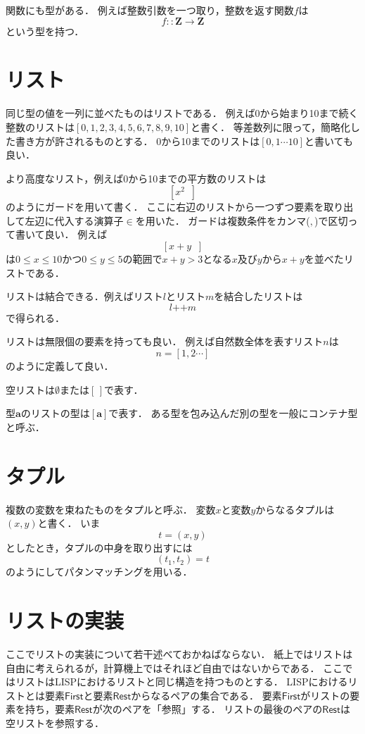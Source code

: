 \documentclass[twocolumn]{jsbook}
\newcommand{\guard}[1]{\mathop{\mid_{{#1}}}}
\newcommand{\listappend}{\mathop{++}}
\newcommand{\typename}[1]{\bm{#1}}
\newcommand{\integertype}{\typename{Z}}
\newcommand{\specialkeyword}[1]{\textsf{#1}}
\newcommand{\firstelem}{\specialkeyword{First}}
\newcommand{\restelems}{\specialkeyword{Rest}}
\begin{document}
関数にも型がある．
例えば整数引数を一つ取り，整数を返す関数$f$は$$f::\integertype\rightarrow\integertype$$という型を持つ．

\section{リスト}

同じ型の値を一列に並べたものはリストである．
例えば0から始まり10まで続く整数のリストは$[0,1,2,3,4,5,6,7,8,9,10]$と書く．
等差数列に限って，簡略化した書き方が許されるものとする．
0から10までのリストは$[0,1\dotsb10]$と書いても良い．

より高度なリスト，例えば0から10までの平方数のリストは$$\left[x^2\guard{x\in[0,1\dotsb 10]}\right]$$のようにガードを用いて書く．
ここに右辺のリストから一つずつ要素を取り出して左辺に代入する演算子$\in$を用いた．
ガードは複数条件をカンマ($,$)で区切って書いて良い．
例えば$$\left[x+y\guard{x\in[0,1\dotsb 10],\,y\in[0,1\dotsb 5],\,x+y>3}\right]$$は$0\le x\le 10$かつ$0\le y\le 5$の範囲で$x+y>3$となる$x$及び$y$から$x+y$を並べたリストである．

リストは結合できる．例えばリスト$l$とリスト$m$を結合したリストは$$l\listappend m$$で得られる．

リストは無限個の要素を持っても良い．
例えば自然数全体を表すリスト$n$は$$n=[1,2\dotsb]$$のように定義して良い．

空リストは$\emptyset$または$[\,]$で表す．

型$\typename{a}$のリストの型は$[\typename{a}]$で表す．
ある型を包み込んだ別の型を一般にコンテナ型と呼ぶ．

\section{タプル}

複数の変数を束ねたものをタプルと呼ぶ．
変数$x$と変数$y$からなるタプルは$(x,y)$と書く．
いま$$t=(x,y)$$としたとき，タプルの中身を取り出すには$$(t_1,t_2)=t$$のようにしてパタンマッチングを用いる．

\section{リストの実装}

ここでリストの実装について若干述べておかねばならない．
紙上ではリストは自由に考えられるが，計算機上ではそれほど自由ではないからである．
ここではリストはLISPにおけるリストと同じ構造を持つものとする．
LISPにおけるリストとは要素$\firstelem$と要素$\restelems$からなるペアの集合である．
要素$\firstelem$がリストの要素を持ち，要素$\restelems$が次のペアを「参照」する．
リストの最後のペアの$\restelems$は空リストを参照する．
\end{document}
